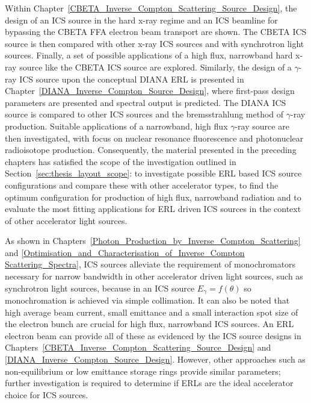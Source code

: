 \documentclass[../main.tex]{subfiles}
\begin{document}
Within Chapter~\ref{CBETA_Inverse_Compton_Scattering_Source_Design}, the design of an ICS source in the hard x-ray regime and an ICS beamline for bypassing the CBETA FFA electron beam transport are shown. The CBETA ICS source is then compared with other x-ray ICS sources and with synchrotron light sources. Finally, a set of possible applications of a high flux, narrowband hard x-ray source like the CBETA ICS source are explored. Similarly, the design of a $\gamma$-ray ICS source upon the conceptual DIANA ERL is presented in Chapter~\ref{DIANA_Inverse_Compton_Source_Design}, where first-pass design parameters are presented and spectral output is predicted. The DIANA ICS source is compared to other ICS sources and the bremsstrahlung method of $\gamma$-ray production. Suitable applications of a narrowband, high flux $\gamma$-ray source are then investigated, with focus on nuclear resonance fluorescence and photonuclear radioisotope production. Consequently, the material presented in the preceding chapters has satisfied the scope of the investigation outlined in Section~\ref{sec:thesis_layout_scope}: to investigate possible ERL based ICS source configurations and compare these with other accelerator types, to find the optimum configuration for production of high flux, narrowband radiation and to evaluate the most fitting applications for ERL driven ICS sources in the context of other accelerator light sources.

As shown in Chapters~\ref{Photon_Production_by_Inverse_Compton_Scattering} and \ref{Optimisation_and_Characterisation_of_Inverse_Compton Scattering_Spectra}, ICS sources alleviate the requirement of monochromators necessary for narrow bandwidth in other accelerator driven light sources, such as synchrotron light sources, because in an ICS source $E_{\gamma} = f\left(\theta\right)$ so monochromation is achieved via simple collimation. It can also be noted that high average beam current, small emittance and a small interaction spot size of the electron bunch are crucial for high flux, narrowband ICS sources. An ERL electron beam can provide all of these as evidenced by the ICS source designs in Chapters~\ref{CBETA_Inverse_Compton_Scattering_Source_Design} and \ref{DIANA_Inverse_Compton_Source_Design}. However, other approaches such as non-equilibrium or low emittance storage rings provide similar parameters; further investigation is required to determine if ERLs are the ideal accelerator choice for ICS sources. 
\end{document}
